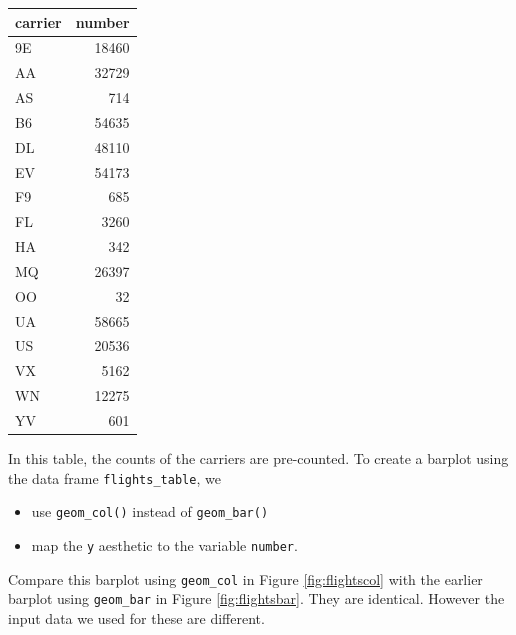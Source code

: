 \documentclass[12pt,]{krantz}
\makeatletter
\newenvironment{Shaded}{\begin{snugshade}}{\end{snugshade}}
\newcommand{\KeywordTok}[1]{\textcolor[rgb]{0.27,0.27,0.27}{\textbf{#1}}}
\newcommand{\DataTypeTok}[1]{\textcolor[rgb]{0.27,0.27,0.27}{#1}}
\newcommand{\StringTok}[1]{\textcolor[rgb]{0.5,0.5,0.5}{#1}}
\newcommand{\OperatorTok}[1]{\textcolor[rgb]{0.43,0.43,0.43}{\textbf{#1}}}
\newcommand{\NormalTok}[1]{#1}
\providecommand{\tightlist}{%
  \setlength{\itemsep}{0pt}\setlength{\parskip}{0pt}}
\newenvironment{kframe}{%
\medskip{}
\setlength{\fboxsep}{.8em}
 \def\at@end@of@kframe{}%
 \ifinner\ifhmode%
  \def\at@end@of@kframe{\end{minipage}}%
  \begin{minipage}{\columnwidth}%
 \fi\fi%
 \def\FrameCommand##1{\hskip\@totalleftmargin \hskip-\fboxsep
 \colorbox{shadecolor}{##1}\hskip-\fboxsep
     \hskip-\linewidth \hskip-\@totalleftmargin \hskip\columnwidth}%
 \MakeFramed {\advance\hsize-\width
   \@totalleftmargin\z@ \linewidth\hsize
   \@setminipage}}%
 {\par\unskip\endMakeFramed%
 \at@end@of@kframe}
\renewenvironment{Shaded}{\begin{kframe}}{\end{kframe}}
\theoremstyle{definition}
\theoremstyle{definition}
\theoremstyle{definition}
\theoremstyle{remark}
\makeatother
\begin{document}
\begin{Shaded}
\end{Shaded}

\begin{table}[H]
\centering\begingroup\fontsize{10}{12}\selectfont

\begin{tabular}{l|r}
\hline
carrier & number\\
\hline
9E & 18460\\
\hline
AA & 32729\\
\hline
AS & 714\\
\hline
B6 & 54635\\
\hline
DL & 48110\\
\hline
EV & 54173\\
\hline
F9 & 685\\
\hline
FL & 3260\\
\hline
HA & 342\\
\hline
MQ & 26397\\
\hline
OO & 32\\
\hline
UA & 58665\\
\hline
US & 20536\\
\hline
VX & 5162\\
\hline
WN & 12275\\
\hline
YV & 601\\
\hline
\end{tabular}
\endgroup{}
\end{table}

In this table, the counts of the carriers are pre-counted. To create a
barplot using the data frame \texttt{flights\_table}, we

\begin{itemize}
\tightlist
\item
  use \texttt{geom\_col()} instead of \texttt{geom\_bar()}
\item
  map the \texttt{y} aesthetic to the variable \texttt{number}.
\end{itemize}

Compare this barplot using \texttt{geom\_col} in Figure
\ref{fig:flightscol} with the earlier barplot using \texttt{geom\_bar}
in Figure \ref{fig:flightsbar}. They are identical. However the input
data we used for these are different.
\end{document}

